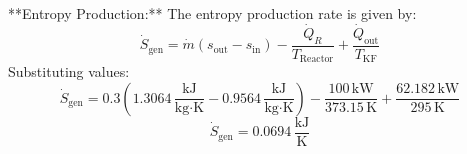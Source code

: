 **Entropy Production:**  
The entropy production rate is given by:  
\[
\dot{S}_{\text{gen}} = \dot{m} \left( s_{\text{out}} - s_{\text{in}} \right) - \frac{\dot{Q}_R}{T_{\text{Reactor}}} + \frac{\dot{Q}_{\text{out}}}{T_{\text{KF}}}
\]  
Substituting values:  
\[
\dot{S}_{\text{gen}} = 0.3 \left( 1.3064 \, \frac{\text{kJ}}{\text{kg·K}} - 0.9564 \, \frac{\text{kJ}}{\text{kg·K}} \right) - \frac{100 \, \text{kW}}{373.15 \, \text{K}} + \frac{62.182 \, \text{kW}}{295 \, \text{K}}
\]  
\[
\dot{S}_{\text{gen}} = 0.0694 \, \frac{\text{kJ}}{\text{K}}
\]